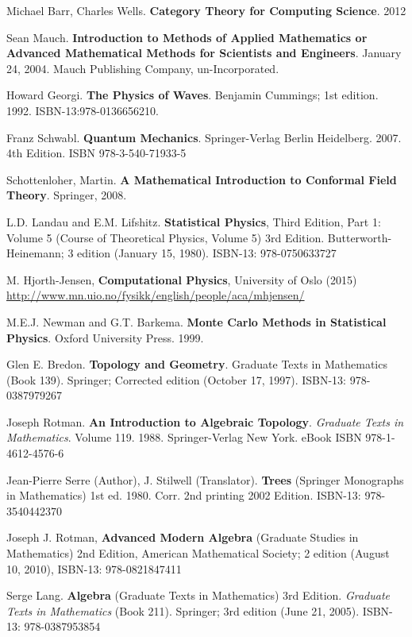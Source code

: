 \documentclass[10pt]{amsart}
\begin{document}
\begin{thebibliography}{9}
Michael Barr, Charles Wells. \textbf{Category Theory for Computing Science}. 2012

Sean Mauch. \textbf{Introduction to Methods of Applied Mathematics or Advanced Mathematical Methods for Scientists and Engineers}. January 24, 2004. Mauch Publishing Company, un-Incorporated. 

Howard Georgi. \textbf{The Physics of Waves}. Benjamin Cummings; 1st edition. 1992. ISBN-13:978-0136656210.


Franz Schwabl. \textbf{Quantum Mechanics}. Springer-Verlag Berlin Heidelberg. 2007. 4th Edition. ISBN 978-3-540-71933-5

Schottenloher, Martin.  \textbf{A Mathematical Introduction to Conformal Field Theory}.  Springer, 2008.  

L.D. Landau and E.M. Lifshitz.  \textbf{Statistical Physics}, Third Edition, Part 1: Volume 5 (Course of Theoretical Physics, Volume 5) 3rd Edition.  Butterworth-Heinemann; 3 edition (January 15, 1980).  ISBN-13: 978-0750633727

M. Hjorth-Jensen, \textbf{Computational Physics}, University of Oslo (2015) \url{http://www.mn.uio.no/fysikk/english/people/aca/mhjensen/}



M.E.J. Newman and G.T. Barkema.  \textbf{Monte Carlo Methods in Statistical Physics}.  Oxford University Press.  1999.  


Glen E. Bredon.  \textbf{Topology and Geometry}. Graduate Texts in Mathematics (Book 139).  Springer; Corrected edition (October 17, 1997).  ISBN-13: 978-0387979267

Joseph Rotman. \textbf{An Introduction to Algebraic Topology}. \emph{Graduate Texts in Mathematics}. Volume 119. 1988. Springer-Verlag New York. eBook ISBN
978-1-4612-4576-6

Jean-Pierre Serre (Author), J. Stilwell (Translator).  \textbf{Trees} (Springer Monographs in Mathematics) 1st ed. 1980. Corr. 2nd printing 2002 Edition.  ISBN-13: 978-3540442370

Joseph J. Rotman, \textbf{Advanced Modern Algebra} (Graduate Studies in Mathematics) 2nd Edition, American Mathematical Society; 2 edition (August 10, 2010), ISBN-13: 978-0821847411

Serge Lang. \textbf{Algebra} (Graduate Texts in Mathematics) 3rd Edition. \emph{Graduate Texts in Mathematics} (Book 211). Springer; 3rd edition (June 21, 2005). ISBN-13: 978-0387953854


\end{thebibliography}
\end{document}
